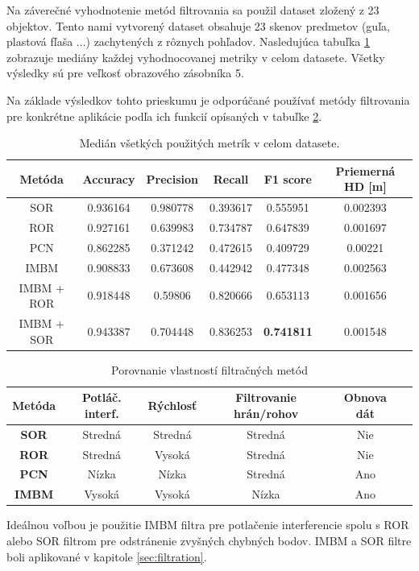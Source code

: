 Na záverečné vyhodnotenie metód filtrovania sa použil dataset zložený z 23 objektov. Tento nami vytvorený dataset obsahuje 23 skenov predmetov (guľa, plastová fľaša ...) zachytených z rôznych pohľadov. Nasledujúca tabuľka \ref{tab:dataset} zobrazuje mediány každej vyhodnocovanej metriky v celom datasete. Všetky výsledky sú pre veľkosť obrazového zásobníka 5.

Na základe výsledkov tohto prieskumu je odporúčané používať metódy filtrovania pre konkrétne aplikácie podľa ich funkcií opísaných v tabuľke \ref{tab:functionality}.


\begin{table}[h]
	\caption{\label{tab:dataset} Medián všetkých použitých metrík v celom datasete. }
	\centering
	\begin{tabular}{cccccc}
		\toprule
		\textbf{Metóda}     & \textbf{Accuracy} & \textbf{Precision} & \textbf{Recall}   & \textbf{F1 score}          & \textbf{Priemerná HD [m]} \\
		\midrule
		SOR        & 0.936164 & 0.980778  & 0.393617 & 0.555951          & 0.002393               \\
		ROR        & 0.927161 & 0.639983  & 0.734787 & 0.647839          & 0.001697               \\
		PCN        & 0.862285 & 0.371242  & 0.472615 & 0.409729          & 0.00221                \\
		IMBM       & 0.908833 & 0.673608  & 0.442942 & 0.477348          & 0.002563               \\
		IMBM + ROR & 0.918448 & 0.59806   & 0.820666 & 0.653113          & 0.001656               \\
		IMBM + SOR & 0.943387 & 0.704448  & 0.836253 & \textbf{0.741811} & 0.001548   \\    \bottomrule  
	\end{tabular}
\end{table}

\begin{table}[h]
	\caption{\label{tab:functionality} Porovnanie vlastností filtračných metód }
	\centering
	\begin{tabular}{cccccc}
		\toprule
		\textbf{Metóda} & \textbf{Potláč. interf.} & \textbf{Rýchlosť} & \textbf{Filtrovanie hrán/rohov} & \textbf{Obnova dát} \\ 
		\midrule
		\textbf{SOR}     & Stredná      & Stredná    & Stredná   & Nie    \\ 
		\textbf{ROR}     & Stredná      & Vysoká      & Stredná   & Nie    \\ 
		\textbf{PCN}     & Nízka       & Nízka       & Stredná   & Ano   	\\ 
		\textbf{IMBM}    & Vysoká      & Vysoká      & Nízka      & Ano   \\ 
		\bottomrule
	\end{tabular}
\end{table}

Ideálnou voľbou je použitie IMBM filtra pre potlačenie interferencie spolu s ROR alebo SOR filtrom pre odstránenie zvyšných chybných bodov. IMBM a SOR filtre boli aplikované v kapitole \ref{sec:filtration}. 